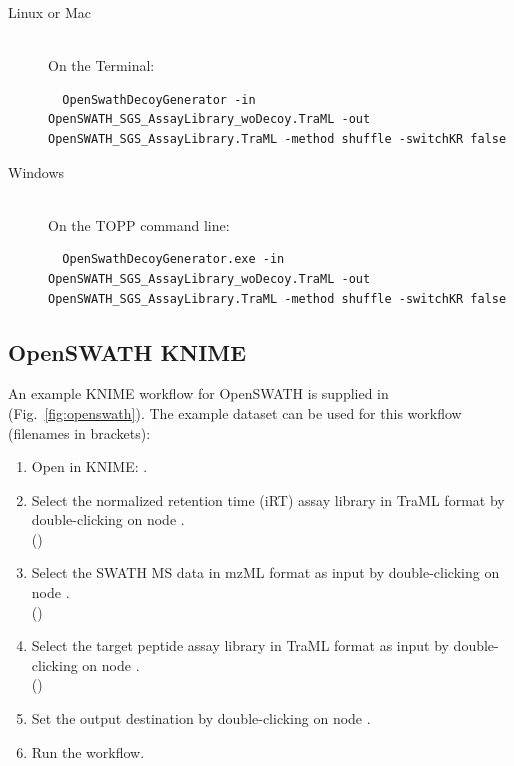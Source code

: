 \begin{description}
  \item[Linux or Mac] \hfill \\
    On the Terminal:
    \begin{lstlisting}
  OpenSwathDecoyGenerator -in OpenSWATH_SGS_AssayLibrary_woDecoy.TraML -out OpenSWATH_SGS_AssayLibrary.TraML -method shuffle -switchKR false
  \end{lstlisting}
  \item[Windows] \hfill \\
    On the TOPP command line:
    \begin{lstlisting}
  OpenSwathDecoyGenerator.exe -in OpenSWATH_SGS_AssayLibrary_woDecoy.TraML -out OpenSWATH_SGS_AssayLibrary.TraML -method shuffle -switchKR false
  \end{lstlisting}
\end{description}

\subsection{OpenSWATH KNIME}
An example KNIME workflow for OpenSWATH is supplied in  (Fig.~\ref{fig:openswath}). The example dataset can be used for this workflow (filenames in brackets):

\begin{enumerate}
  \item Open  in KNIME: .
  \item Select the normalized retention time (iRT) assay library in TraML format by double-clicking on node .\\
  ()
  \item Select the SWATH MS data in mzML format as input by double-clicking on node .\\
  ()
  \item Select the target peptide assay library in TraML format  as input by double-clicking on node .\\
  ()
  \item Set the output destination by double-clicking on node .\\
  \item Run the workflow.
\end{enumerate}

